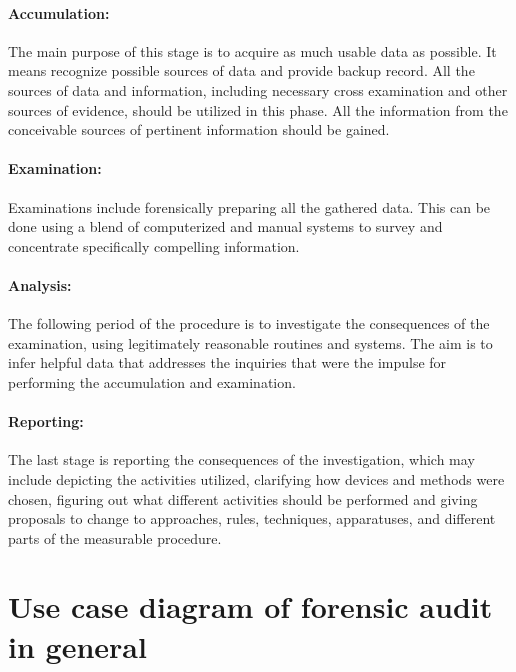 \paragraph{Accumulation:} 
The main purpose of this stage is to acquire as much usable data as possible. It means recognize possible sources of data and provide backup record. All the sources of data and information, including necessary cross examination and other sources of evidence, should be utilized in this phase. All the information from the conceivable sources of pertinent information should be gained.

\paragraph{Examination:}
Examinations include forensically preparing all the gathered data. This can be done using a blend of computerized and manual systems to survey and concentrate specifically compelling information. 

\paragraph{Analysis:}
The following period of the procedure is to investigate the consequences of the examination, using legitimately reasonable routines and systems. The aim is to infer helpful data that addresses the inquiries that were the impulse for performing the accumulation and examination. 


\paragraph{Reporting:}
The last stage is reporting the consequences of the investigation, which may include depicting the activities utilized, clarifying how devices and methods were chosen, figuring out what different activities should be performed and giving proposals to change to approaches, rules, techniques, apparatuses, and different parts of the measurable procedure. 







\section{Use case diagram of forensic audit in general}

